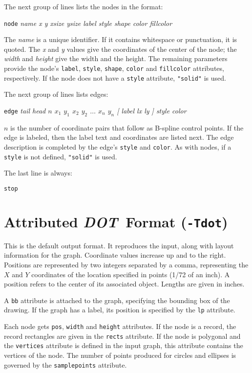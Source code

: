 \documentclass[11pt]{article}
\def\DOT{{\it DOT}}
\begin{document}
{{The next group of lines lists the nodes in the format:

\hspace{.5in}\verb"node" {\it name x y xsize ysize label style shape color fillcolor }

The {\it name} is a unique identifier. If it contains whitespace or
punctuation, it is quoted. The {\it x} and {\it y} values give the coordinates
of the center of the node; the {\it width} and {\it height} give the 
width and the height. The remaining parameters provide the node's
{\tt label}, {\tt style}, {\tt shape}, {\tt color} and {\tt fillcolor} 
attributes, respectively. If the node does not have a {\tt style} attribute,
{\tt "solid"} is used. 

The next group of lines lists edges:

\hspace{.5in}\verb"edge" {\it tail head $n$ $x_1$ $y_1$ $x_2$ $y_2$
$\ldots$ $x_n$ $y_n$ {\rm [} label lx ly {\rm ]} style color }

$n$ is the number of coordinate pairs that follow as B-spline
control points.  If the edge is labeled, then the label text and
coordinates are listed next. The edge description is completed by 
the edge's {\tt style} and {\tt color}. As with nodes, if a {\tt style} is not
defined, {\tt "solid"} is used. 

The last line is always:

\hspace{.5in}\verb"stop"
}

\clearpage
\section{Attributed \DOT\ Format ({\tt -Tdot})}
\label{sect:output}

This is the default output format. It reproduces the input, 
along with layout information for the graph. Coordinate values
increase up and to the right. Positions are represented by two
integers separated by a comma, representing the $X$ and $Y$ coordinates
of the location specified in points (1/72 of an inch). A position
refers to the center of its associated object.
Lengths are given in inches.

A {\tt bb} attribute is attached to the graph, 
specifying the bounding box of the drawing. If the graph has a label, 
its position is specified by the {\tt lp} attribute. 

Each node gets {\tt pos}, {\tt width} and {\tt height} attributes. 
If the node is a record, the record rectangles are given in the {\tt rects}
attribute. If the node is polygonal and the {\tt vertices} 
attribute is defined in the input graph, this attribute contains the 
vertices of the node. The number of points produced for circles and ellipses
is governed by the {\tt samplepoints} attribute.

}
\end{document}
